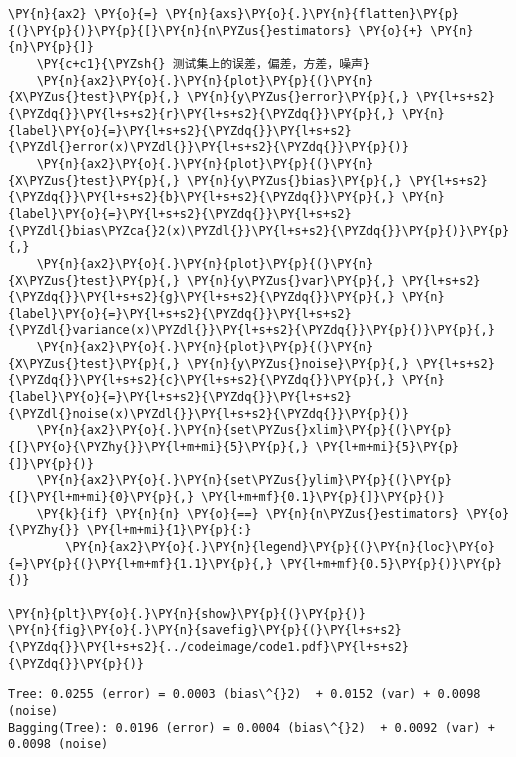 \begin{Verbatim}[commandchars=\\\{\}]
    \PY{n}{ax2} \PY{o}{=} \PY{n}{axs}\PY{o}{.}\PY{n}{flatten}\PY{p}{(}\PY{p}{)}\PY{p}{[}\PY{n}{n\PYZus{}estimators} \PY{o}{+} \PY{n}{n}\PY{p}{]}
    \PY{c+c1}{\PYZsh{} 测试集上的误差，偏差，方差，噪声}
    \PY{n}{ax2}\PY{o}{.}\PY{n}{plot}\PY{p}{(}\PY{n}{X\PYZus{}test}\PY{p}{,} \PY{n}{y\PYZus{}error}\PY{p}{,} \PY{l+s+s2}{\PYZdq{}}\PY{l+s+s2}{r}\PY{l+s+s2}{\PYZdq{}}\PY{p}{,} \PY{n}{label}\PY{o}{=}\PY{l+s+s2}{\PYZdq{}}\PY{l+s+s2}{\PYZdl{}error(x)\PYZdl{}}\PY{l+s+s2}{\PYZdq{}}\PY{p}{)}
    \PY{n}{ax2}\PY{o}{.}\PY{n}{plot}\PY{p}{(}\PY{n}{X\PYZus{}test}\PY{p}{,} \PY{n}{y\PYZus{}bias}\PY{p}{,} \PY{l+s+s2}{\PYZdq{}}\PY{l+s+s2}{b}\PY{l+s+s2}{\PYZdq{}}\PY{p}{,} \PY{n}{label}\PY{o}{=}\PY{l+s+s2}{\PYZdq{}}\PY{l+s+s2}{\PYZdl{}bias\PYZca{}2(x)\PYZdl{}}\PY{l+s+s2}{\PYZdq{}}\PY{p}{)}\PY{p}{,}
    \PY{n}{ax2}\PY{o}{.}\PY{n}{plot}\PY{p}{(}\PY{n}{X\PYZus{}test}\PY{p}{,} \PY{n}{y\PYZus{}var}\PY{p}{,} \PY{l+s+s2}{\PYZdq{}}\PY{l+s+s2}{g}\PY{l+s+s2}{\PYZdq{}}\PY{p}{,} \PY{n}{label}\PY{o}{=}\PY{l+s+s2}{\PYZdq{}}\PY{l+s+s2}{\PYZdl{}variance(x)\PYZdl{}}\PY{l+s+s2}{\PYZdq{}}\PY{p}{)}\PY{p}{,}
    \PY{n}{ax2}\PY{o}{.}\PY{n}{plot}\PY{p}{(}\PY{n}{X\PYZus{}test}\PY{p}{,} \PY{n}{y\PYZus{}noise}\PY{p}{,} \PY{l+s+s2}{\PYZdq{}}\PY{l+s+s2}{c}\PY{l+s+s2}{\PYZdq{}}\PY{p}{,} \PY{n}{label}\PY{o}{=}\PY{l+s+s2}{\PYZdq{}}\PY{l+s+s2}{\PYZdl{}noise(x)\PYZdl{}}\PY{l+s+s2}{\PYZdq{}}\PY{p}{)}
    \PY{n}{ax2}\PY{o}{.}\PY{n}{set\PYZus{}xlim}\PY{p}{(}\PY{p}{[}\PY{o}{\PYZhy{}}\PY{l+m+mi}{5}\PY{p}{,} \PY{l+m+mi}{5}\PY{p}{]}\PY{p}{)}
    \PY{n}{ax2}\PY{o}{.}\PY{n}{set\PYZus{}ylim}\PY{p}{(}\PY{p}{[}\PY{l+m+mi}{0}\PY{p}{,} \PY{l+m+mf}{0.1}\PY{p}{]}\PY{p}{)}
    \PY{k}{if} \PY{n}{n} \PY{o}{==} \PY{n}{n\PYZus{}estimators} \PY{o}{\PYZhy{}} \PY{l+m+mi}{1}\PY{p}{:}
        \PY{n}{ax2}\PY{o}{.}\PY{n}{legend}\PY{p}{(}\PY{n}{loc}\PY{o}{=}\PY{p}{(}\PY{l+m+mf}{1.1}\PY{p}{,} \PY{l+m+mf}{0.5}\PY{p}{)}\PY{p}{)}

\PY{n}{plt}\PY{o}{.}\PY{n}{show}\PY{p}{(}\PY{p}{)}
\PY{n}{fig}\PY{o}{.}\PY{n}{savefig}\PY{p}{(}\PY{l+s+s2}{\PYZdq{}}\PY{l+s+s2}{../codeimage/code1.pdf}\PY{l+s+s2}{\PYZdq{}}\PY{p}{)}
\end{Verbatim}

\begin{Verbatim}[commandchars=\\\{\}]
Tree: 0.0255 (error) = 0.0003 (bias\^{}2)  + 0.0152 (var) + 0.0098 (noise)
Bagging(Tree): 0.0196 (error) = 0.0004 (bias\^{}2)  + 0.0092 (var) + 0.0098 (noise)
\end{Verbatim}